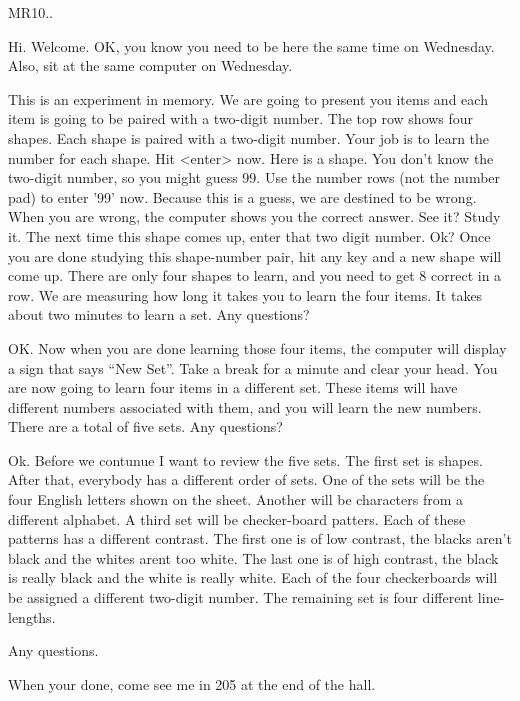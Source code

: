 MR10..

Hi.  Welcome.  OK, you know you need to be here the same time on
Wednesday.  Also, sit at the same computer on Wednesday.

This is an experiment in memory.  We are going to present you items
and each item is going to be paired with a two-digit number.  The top
row shows four shapes.  Each shape is paired with a two-digit number.
Your job is to learn the number for each shape.  Hit <enter> now.
Here is a shape.  You don't know the two-digit number, so you might
guess 99.  Use the number rows (not the number pad) to enter '99' now.
Because this is a guess, we are destined to be wrong.  When you are
wrong, the computer shows you the correct answer.  See it?  Study it.
The next time this shape comes up, enter that two digit number.  Ok?
Once you are done studying this shape-number pair, hit any key and a
new shape will come up.  There are only four shapes to learn, and you
need to get 8 correct in a row.  We are measuring how long it takes
you to learn the four items.  It takes about two minutes to learn a set.
Any questions?

OK.  Now when you are done learning those four items, the computer
will display a sign that says ``New Set''.  Take a break for a minute
and clear your head.  You are now going to learn four items in a
different set.  These items will have different numbers associated
with them, and you will learn the new numbers.  There are a total of
five sets.  Any questions?

Ok. Before we contunue I want to review the five sets.  The first set
is shapes.  After that, everybody has a different order of sets.  One
of the sets will be the four English letters shown on the sheet.
Another will be characters from a different alphabet.  A third set
will be checker-board patters.  Each of these patterns has a different
contrast.  The first one is of low contrast, the blacks aren't black
and the whites arent too white.  The last one is of high contrast, the
black is really black and the white is really white.  Each of the four
checkerboards will be assigned a different two-digit number.  The
remaining set is four different line-lengths.

Any questions.

When your done, come see me in 205 at the end of the hall.

 

